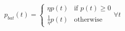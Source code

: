 \begin{equation}
	p_{bat}(t) =
	\begin{cases}
		\eta p(t) &\text{if } p(t) \geq 0\\
		\frac{1}{\eta}p(t) &\text{otherwise}
	\end{cases}
	\forall t
	\label{ch2:equ:battery-power}
\end{equation}